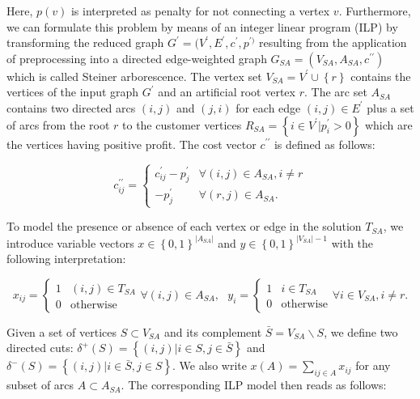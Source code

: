 \documentclass{SMBV12}
\begin{document}
Here, $p(v)$ is interpreted as penalty for not connecting a vertex $v$. Furthermore, we can formulate this problem by means of an integer linear program (ILP) by transforming the reduced graph $G^{\prime} = (V^{\prime}, E^{\prime}, c^{\prime}, p^{\prime)}$ resulting from the application of preprocessing into a directed edge-weighted graph $G_{SA} = (V_{SA}, A_{SA}, c^{\prime \prime})$ which is called Steiner arborescence. The vertex set $V_{SA} = V^{\prime} \cup \left\lbrace r \right\rbrace $ contains the vertices of the input graph $G^{\prime}$ and an artificial root vertex $r$. The arc set $A_{SA}$ contains two directed arcs $(i, j)$ and $(j, i)$ for each edge $(i, j) \in E^{\prime}$ plus a set of arcs from the root $r$ to the customer vertices $R_{SA} = \left\lbrace i \in V^{\prime} \lvert p_i^{\prime} > 0 \right\rbrace $ which are the vertices having positive profit. The cost vector $c^{\prime \prime}$ is defined as follows:

\begin{equation}
c_{ij}^{\prime \prime} = 
	\begin{cases} 
		c_{ij}^{\prime} - p_j^{\prime} & \forall (i, j) \in A_{SA}, i \neq r \\ 
		- p_j^{\prime} &  \forall (r, j) \in A_{SA} .
	\end{cases}
\end{equation}

To model the presence or absence of each vertex or edge in the solution $T_{SA}$, we introduce variable vectors $x \in \left\lbrace 0, 1 \right\rbrace ^ {\lvert A_{SA} \rvert}$ and $y \in \left\lbrace 0, 1 \right\rbrace ^ {\lvert V_{SA} \rvert - 1}$ with the following interpretation:

\begin{equation}
x_{ij} = 
	\begin{cases}
		1 & (i, j) \in T_{SA}\\
		0 & \mbox{otherwise}
	\end{cases}
	\forall (i, j) \in A_{SA},\ \ \ 
y_i = 
	\begin{cases}
		1 & i \in T_{SA}\\
		0 & \mbox{otherwise}
	\end{cases}
	\forall i \in V_{SA}, i \neq r.
\end{equation}

Given a set of vertices $S \subset V_{SA}$ and its complement $\bar{S} = V_{SA} \backslash S$, we define two directed cuts: $\delta^+(S) = \left\lbrace (i, j) \lvert i \in S, j \in \bar{S} \right\rbrace $ and $\delta^-(S) = \left\lbrace (i, j) \lvert i \in \bar{S}, j \in S \right\rbrace $. We also write $x(A) = \sum\limits_{ij \in A} x_{ij}$ for any subset of arcs $A \subset A_{SA}$. The corresponding ILP model then reads as follows:
\end{document}

